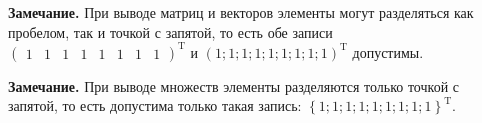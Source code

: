 \textbf{Замечание.} При выводе матриц и векторов элементы могут разделяться как пробелом, так и точкой с запятой, то есть обе записи $ {\left(\begin{array}{cccccccc}
 1&1&1&1&1&1&1&1
\end{array} \right)}^\mathrm{T} $ и $ {\left(1;1;1;1;1;1;1;1;1 \right)}^\mathrm{T} $ допустимы.

\textbf{Замечание.} При выводе множеств элементы разделяются только точкой с запятой, то есть допустима только такая запись: $ {\left\lbrace 1;1;1;1;1;1;1;1;1 \right\rbrace }^\mathrm{T} $.

\singlespacing
\clearpage